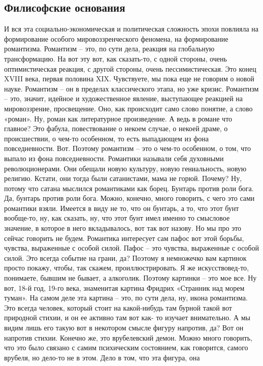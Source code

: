 \subsection{Филисофские основания}
И вся эта социально-экономическая и политическая сложность эпохи повлияла на
формирование особого мировоззренческого феномена, на формирование романтизма.
Романтизм – это, по сути дела, реакция на глобальную трансформацию. На вот эту
вот, как сказать-то, с одной стороны, очень оптимистическая реакция, с другой
стороны, очень пессимистическая. Это конец XVIII века, первая половина XIX.
Чувствуете, мы пока еще не говорим о новой науке. Романтизм – он в пределах
классического этапа, но уже кризис. Романтизм – это, значит, идейное и
художественное явление, выступающее реакцией на мировоззрение, просвещение. Оно,
как происходит само слово понятие, а слово «роман». Ну, роман как литературное
произведение. А ведь в романе что главное? Это фабула, повествование о некоем
случае, о некоей драме, о происшествии, о чем-то особенном, то есть выпадающем
из фона повседневности. Вот. Поэтому романтизм – это о чем-то особенном, о том,
что выпало из фона повседневности. Романтики называли себя духовными
революционерами. Они обещали новую культуру, новую гениальность, новую религию.
Кстати, они тогда были сатанистами, мама не горюй. Почему? Ну, потому что сатана
мыслился романтиками как борец. Бунтарь против роли бога. Да, бунтарь против
роли бога. Можно, конечно, много говорить, с чего это сами романтики взяли.
Имеется в виду не то, что он бунтарь, а то, что этот бунт вообще-то, ну, как
сказать, ну, что этот бунт имел именно то смысловое значение, в которое в него
вкладывалось, вот так вот назову. Но мы про это сейчас говорить не будем.
Романтика интересует сам пафос вот этой борьбы, чувства, выраженные с особой
силой. Пафос – это чувства, выраженные с особой силой. Это всегда событие на
грани, да? Поэтому я немножечко вам картинок просто покажу, чтобы, так скажем,
проиллюстрировать. Я же искусствовед-то, понимаете, бывшим не бывает, а
алкоголик. Поэтому картинки – это мое все. Ну вот, 18-й год, 19-го века,
знаменитая картина Фридрих «Странник над морем туман». На самом деле эта картина
– это, по сути дела, ну, икона романтизма. Это всегда человек, который стоит на
какой-нибудь там бурной такой вот природной стихии, и он ее активно там вот как-
то изучает внимательно. А мы видим лишь его такую вот в некотором смысле фигуру
напротив, да? Вот он напротив стихии. Конечно же, это врубелевский демон. Можно
много говорить, что это было связано с самим психическим состоянием, как
говорится, самого врубеля, но дело-то не в этом. Дело в том, что эта фигура, она
